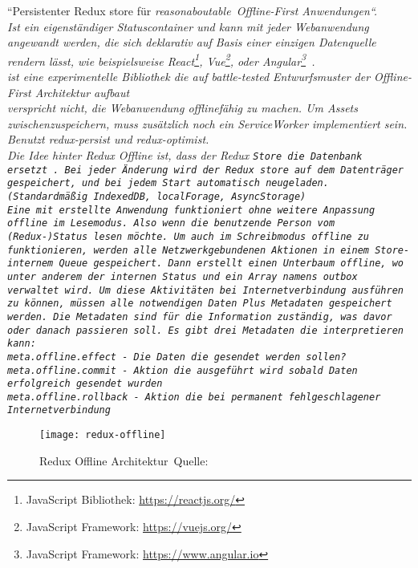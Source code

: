 ``Persistenter Redux store für \it{reasonaboutable}\texttrademark ~Offline-First Anwendungen``. \\
Ist ein eigenständiger Statuscontainer und kann mit jeder Webanwendung angewandt werden, die sich \it{deklarativ auf Basis einer einzigen Datenquelle rendern lässt}, wie beispielsweise React\footnote{JavaScript Bibliothek: \url{https://reactjs.org/}}, Vue\footnote{JavaScript Framework: \url{https://vuejs.org/}}, oder Angular\footnote{JavaScript Framework: \url{https://www.angular.io}}~\cite{redux-offline-compabilaty}.\\
ist eine experimentelle Bibliothek die auf \it{battle-tested} Entwurfsmuster der Offline-First Architektur aufbaut\\
 verspricht nicht, die Webanwendung offlinefähig zu machen. Um \gls{Assets} zwischenzuspeichern, muss zusätzlich noch ein ServiceWorker implementiert sein.\\
Benutzt redux-persist und redux-optimist.\\
Die Idee hinter Redux Offline ist, dass der Redux \tt{Store} die Datenbank ersetzt~\cite{redux-offline}.
Bei jeder Änderung wird der Redux store auf dem Datenträger gespeichert, und bei jedem Start automatisch neugeladen. (Standardmäßig IndexedDB, localForage, AsyncStorage)\\
Eine mit  erstellte Anwendung funktioniert ohne weitere Anpassung offline im Lesemodus. Also wenn die benutzende Person vom (Redux-)Status lesen möchte.
Um auch im Schreibmodus offline zu funktionieren, werden alle Netzwerkgebundenen Aktionen in einem Store-internem \gls{Queue} gespeichert. Dann erstellt  einen Unterbaum \tt{offline}, wo unter anderem der internen Status und ein Array namens \tt{outbox} verwaltet wird. Um diese Aktivitäten bei Internetverbindung ausführen zu können, müssen alle notwendigen Daten Plus Metadaten gespeichert werden. Die Metadaten sind für die Information zuständig, was davor oder danach passieren soll. Es gibt drei Metadaten die  interpretieren kann:\\
\tt{meta.offline.effect} - Die Daten die gesendet werden sollen?\\
\tt{meta.offline.commit} - Aktion die ausgeführt wird sobald Daten erfolgreich gesendet wurden\\
\tt{meta.offline.rollback} - Aktion die bei permanent fehlgeschlagener Internetverbindung
~\cite{redux-offline-gh}
\begin{figure}[H]
  \centering
  \texttt{[image: redux-offline]}
  \grayRule
  \caption[Redux Offline]{Redux Offline Architektur~Quelle:~\cite{redux-offline}}
  \label{fig:redux-offline}
\end{figure}
